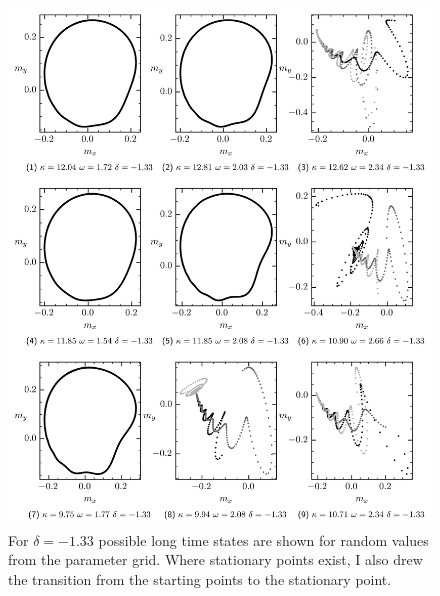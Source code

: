     \begin{figure}[H]
        \centering
        \includegraphics{pictures/lc_traj_dcut2.png}
        \caption{For $\delta=-1.33$ possible long time states are shown for random values from the parameter grid. Where stationary points exist, I also drew the transition from the starting points to the stationary point.}
    \end{figure}\newpage

